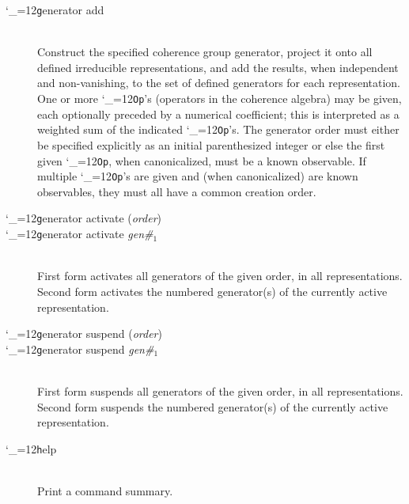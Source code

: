 \documentclass [12pt]{article}
\makeatletter
\renewcommand{\tt}{\begingroup\catcode`_=12\def\_{\string_}\tt@}
\newcommand{\tt@}[1]{\texttt{#1}\endgroup}
\makeatother
\begin{document}
\begin{description}
\item [\tt generator add {\tt{[}}({\it order}){\tt{]}}
    {\tt{[}}{\it coeff$_1$}{\tt{]}} {\it op$_1$}
    {\tt{[[}}{\it coeff$_2$}{\tt{]}} {\it op$_2$}{\tt{]}} $\cdots$ ]~\\
    Construct the specified coherence group generator, 
    project it onto all defined irreducible representations,
    and add the results, when independent and non-vanishing, to the
    set of defined generators for each representation.
    One or more \tt{Op}'s (operators in the coherence algebra)
    may be given,
    each optionally preceded by a numerical coefficient;
    this is interpreted as a weighted sum of the indicated \tt{Op}'s.
    The generator order must either be specified explicitly
    as an initial parenthesized integer
    or else the first given \tt{Op}, when canonicalized,
    must be a known observable.
    If multiple \tt{Op}'s are given and (when canonicalized)
    are known observables, they must all have a common creation order.

\item [\tt generator activate ({\it order})] \bgroup\itemsep 0pt \parskip 0pt
\item [\tt generator activate {\it{gen\#$_1$}} {\tt{[}}{\it gen\#$_2$}{\tt{]}} $\cdots$ ]~\\
    First form activates all generators of the given order, in all representations.
    Second form activates the numbered generator(s) of the currently active representation.
\egroup

\item [\tt generator suspend ({\it order})] \bgroup\itemsep 0pt \parskip 0pt
\item [\tt generator suspend {\it{gen\#$_1$}} {\tt{[}}{\it gen\#$_2$}{\tt{]}} $\cdots$ ]~\\
    First form suspends all generators of the given order, in all representations.
    Second form suspends the numbered generator(s) of the currently active representation.
\egroup

\item [\tt help]~\\
    Print a command summary.


\end{description}
\end{document}
